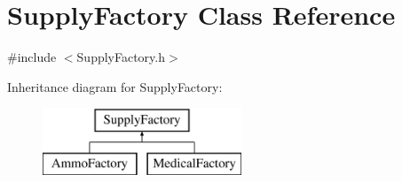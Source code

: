 \hypertarget{class_supply_factory}{}\section{Supply\+Factory Class Reference}
\label{class_supply_factory}


{\ttfamily \#include $<$Supply\+Factory.\+h$>$}

Inheritance diagram for Supply\+Factory\+:\begin{figure}[H]
\begin{center}
\leavevmode
\includegraphics[height=2.000000cm]{class_supply_factory}
\end{center}
\end{figure}
